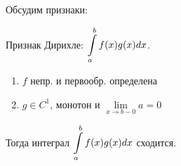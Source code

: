 Обсудим признаки:

Признак Дирихле: $\displaystyle\int\limits_{a}^{b}f(x)g(x)dx$. 

\begin{enumerate}
    \item $f$ непр. и первообр. определена
    \item $g \in C^1$, монотон и $\lim\limits_{x \xrightarrow{}b-0}a = 0$
\end{enumerate}

Тогда интеграл $\displaystyle\int\limits_{a}^{b}f(x)g(x)dx$ сходится.

